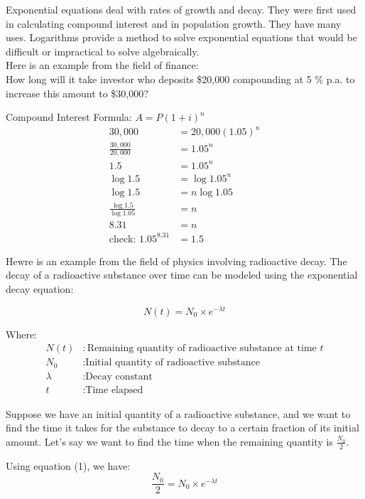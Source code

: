 \documentclass{article}
\begin{document}
Exponential equations deal with rates of growth and decay. They were first used in calculating compound interest and in population growth. They have many uses. Logarithms provide a method to solve exponential equations that would be difficult or impractical to solve algebraically.\\

Here is an example from the field of finance:\\

How long will it take investor who deposits \$20,000 compounding at 5 \% p.a. to increase this amount to \$30,000?

Compound Interest Formula:		$A=P(1+i)^n$
\begin{align*}
30,000&=20,000(1.05)^n\\
\frac{30,000}{20,000}&=1.05^n\\
1.5&=1.05^n\\
\log{1.5}&=\log{1.05^n}\\
\log{1.5}&=n\log{1.05}\\
\frac{\log{1.5}}{\log{1.05}}&=n\\
8.31&=n\\
\text{check: }1.05^{8.31}&=1.5
\end{align*}

Hewre is an example from the field of physics involving radioactive decay. The decay of a radioactive substance over time can be modeled using the exponential decay equation:

\begin{equation}
N(t) = N_0 \times e^{-\lambda t}
\end{equation}

Where:
\begin{align*}
N(t) & : \text{Remaining quantity of radioactive substance at time } t \\
N_0 & : \text{Initial quantity of radioactive substance} \\
\lambda & : \text{Decay constant} \\
t & : \text{Time elapsed}
\end{align*}

Suppose we have an initial quantity of a radioactive substance, and we want to find the time it takes for the substance to decay to a certain fraction of its initial amount. Let's say we want to find the time when the remaining quantity is $\frac{N_0}{2}$.

Using equation (1), we have:
\[
\frac{N_0}{2} = N_0 \times e^{-\lambda t}
\]
\end{document}
